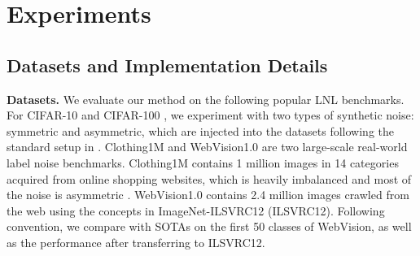 \documentclass{article} \usepackage{iclr2023_conference,times}
\begin{document}
\section{Experiments}\label{sec:exp}
\subsection{Datasets and Implementation Details}
\textbf{Datasets.} We evaluate our method on the following popular LNL benchmarks. For CIFAR-10 and CIFAR-100 \citep{krizhevsky2009learning}, we experiment with two types of synthetic noise: symmetric and asymmetric, which are injected into the datasets following the standard setup in \citep{Li2020DivideMixLW}. Clothing1M \citep{xiao2015learning} and WebVision1.0 \citep{li2017webvision} are two large-scale real-world label noise benchmarks. Clothing1M contains 1 million images in 14 categories acquired from online shopping websites, which is heavily imbalanced and most of the noise is asymmetric \citep{yi2019probabilistic}. WebVision1.0 contains 2.4 million images crawled from the web using the concepts in ImageNet-ILSVRC12 (ILSVRC12). Following convention, we compare with SOTAs on the first 50 classes of WebVision, as well as the performance after transferring to ILSVRC12.  
\end{document}
